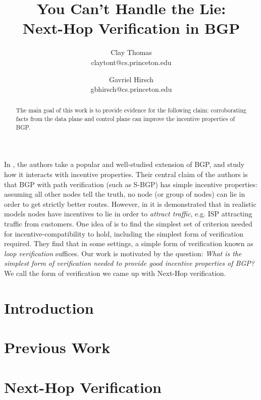 \documentclass[12pt]{article}
\begin{document}

\title{
  You Can't Handle the Lie: \\
  Next-Hop Verification in BGP
}
\author{
  Clay Thomas\\ claytont@cs.princeton.edu
  \and 
  Gavriel Hirsch\\ gbhirsch@cs.princeton.edu 
}
\maketitle

\begin{abstract}
  The main goal of this work is to provide evidence for the following
  claim: corroborating facts from the data plane and control plane
  can improve the incentive properties of BGP.
\end{abstract}

  In \cite{RoutingGames}, the authors take a popular
  and well-studied extension of BGP,
  and study how it interacts with incentive properties.
  Their central claim of the authors is
  that BGP with path verification (such as S-BGP) has
  simple incentive properties: assuming all other nodes tell the truth,
  no node (or group of nodes) can lie in order to get strictly better routes.
  However, in \cite{Attraction} it is demonstrated that in realistic models
  nodes have incentives to lie in order to \emph{attract traffic}, e.g.
  ISP attracting traffic from customers.
  One idea of \cite{Attraction} is to find the simplest set of criterion
  needed for incentive-compatibility to hold, including the
  simplest form of verification required.
  They find that in some settings, a simple form of verification known
  as \emph{loop verification} suffices.
  Our work is motivated by the question:
  \emph{What is the simplest form of verification needed to provide
  good incentive properties of BGP?}
  We call the form of verification we came up with Next-Hop verification.


\section{Introduction}

\section{Previous Work}

\section{Next-Hop Verification}
\end{document}
